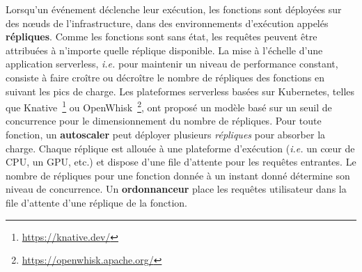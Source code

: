 
Lorsqu'un événement déclenche leur exécution, les fonctions sont déployées sur des nœuds de l'infrastructure, dans des environnements d'exécution appelés \textbf{répliques}. Comme les fonctions sont sans état, les requêtes peuvent être attribuées à n'importe quelle réplique disponible. La mise à l'échelle d'une application serverless, \textit{i.e.} pour maintenir un niveau de performance constant, consiste à faire croître ou décroître le nombre de répliques des fonctions en suivant les pics de charge. Les plateformes serverless basées sur Kubernetes, telles que Knative~\footnote{\href{https://knative.dev/}{https://knative.dev/}} ou OpenWhisk~\footnote{\href{https://openwhisk.apache.org/}{https://openwhisk.apache.org/}}, ont proposé un modèle basé sur un seuil de concurrence pour le dimensionnement du nombre de répliques. Pour toute fonction, un \textbf{autoscaler} peut déployer plusieurs \textit{répliques} pour absorber la charge. Chaque réplique est allouée à une plateforme d'exécution (\textit{i.e.} un cœur de CPU, un GPU, etc.) et dispose d'une file d'attente pour les requêtes entrantes. Le nombre de répliques pour une fonction donnée à un instant donné détermine son niveau de concurrence. Un \textbf{ordonnanceur} place les requêtes utilisateur dans la file d'attente d'une réplique de la fonction.


